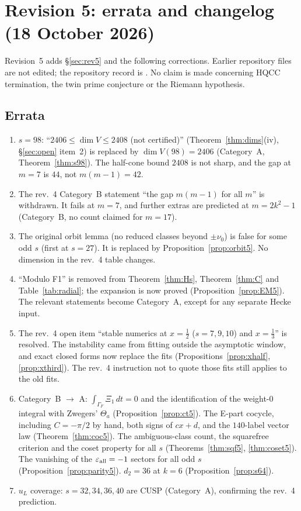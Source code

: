 \section{Revision 5: errata and changelog (18 October 2026)}\label{app:rev5}
Revision~5 adds \S\ref{sec:rev5} and the following corrections. Earlier repository files are not edited; the repository record is
. No claim is made concerning HQCC termination, the twin prime conjecture or the Riemann hypothesis.
\subsection{Errata}
\begin{enumerate}[label=\textbf{R5.\arabic*},leftmargin=3.2em]
\item $s=98$: ``$2406\le\dim V\le2408$ (not certified)'' (Theorem~\ref{thm:dims}(iv), \S\ref{sec:open} item~2) is replaced by $\dim V(98)=2406$ (Category~A, Theorem~\ref{thm:s98}). The half-cone bound $2408$ is not sharp, and the gap at $m=7$ is $44$, not $m(m-1)=42$.
\item The rev.~4 Category~B statement ``the gap $m(m-1)$ for all $m$'' is withdrawn. It fails at $m=7$, and further extras are predicted at $m=2k^2-1$ (Category~B, no count claimed for $m=17$).
\item The original orbit lemma (no reduced classes beyond $\pm\nu_0$) is false for some odd $s$ (first at $s=27$). It is replaced by Proposition~\ref{prop:orbit5}. No dimension in the rev.~4 table changes.
\item ``Modulo F1'' is removed from Theorem~\ref{thm:Hs}, Theorem~\ref{thm:C} and Table~\ref{tab:radial}; the expansion is now proved (Proposition~\ref{prop:EM5}). The relevant statements become Category~A, except for any separate Hecke input.
\item The rev.~4 open item ``stable numerics at $x=\tfrac12$ ($s=7,9,10$) and $x=\tfrac13$'' is resolved. The instability came from fitting outside the asymptotic window, and exact closed forms now replace the fits (Propositions~\ref{prop:xhalf}, \ref{prop:xthird}). The rev.~4 instruction not to quote those fits still applies to the old fits.
\item Category~B $\to$ A: $\int_{\Gamma_F}\Xi_1\,dt=0$ and the identification of the weight-$0$ integral with Zwegers' $\Theta_a$ (Proposition~\ref{prop:ct5}). The E-part cocycle, including $C=-\pi/2$ by hand, both signs of $cx+d$, and the $140$-label vector law (Theorem~\ref{thm:coc5}). The ambiguous-class count, the squarefree criterion and the coset property for all $s$ (Theorems~\ref{thm:sqf5}, \ref{thm:coset5}). The vanishing of the $\varepsilon_{\rm all}=-1$ sectors for all odd $s$ (Proposition~\ref{prop:parity5}). $d_2=36$ at $k=6$ (Proposition~\ref{prop:s64}).
\item $u_L$ coverage: $s=32,34,36,40$ are CUSP (Category~A), confirming the rev.~4 prediction.
\end{enumerate}
